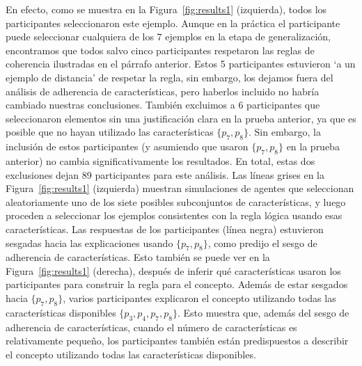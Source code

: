 En efecto, como se muestra en la Figura~\ref{fig:results1} (izquierda), todos los participantes seleccionaron este ejemplo. Aunque en la práctica el participante puede seleccionar cualquiera de los 7 ejemplos en la etapa de generalización, encontramos que todos salvo cinco participantes respetaron las reglas de coherencia ilustradas en el párrafo anterior. Estos 5 participantes estuvieron `a un ejemplo de distancia' de respetar la regla, sin embargo, los dejamos fuera del análisis de adherencia de características, pero haberlos incluido no habría cambiado nuestras conclusiones. También excluimos a 6 participantes que seleccionaron elementos sin una justificación clara en la prueba anterior, ya que es posible que no hayan utilizado las características $ \{p_7, p_8 \} $. Sin embargo, la inclusión de estos participantes (y asumiendo que usaron $ \{p_7, p_8 \} $ en la prueba anterior) no cambia significativamente los resultados. En total, estas dos exclusiones dejan 89 participantes para este análisis. Las líneas grises en la Figura~\ref{fig:results1} (izquierda) muestran simulaciones de agentes que seleccionan aleatoriamente uno de los siete posibles subconjuntos de características, y luego proceden a seleccionar los ejemplos consistentes con la regla lógica usando esas características. Las respuestas de los participantes (línea negra) estuvieron sesgadas hacia las explicaciones usando $ \{p_7, p_8 \} $, como predijo el sesgo de adherencia de características. Esto también se puede ver en la Figura~\ref{fig:results1} (derecha), después de inferir qué características usaron los participantes para construir la regla para el concepto. Además de estar sesgados hacia $ \{p_7, p_8 \}$, varios participantes explicaron el concepto utilizando todas las características disponibles $ \{p_3, p_4, p_7, p_8 \} $. Esto muestra que, además del sesgo de adherencia de características, cuando el número de características es relativamente pequeño, los participantes también están predispuestos a describir el concepto utilizando todas las características disponibles.


